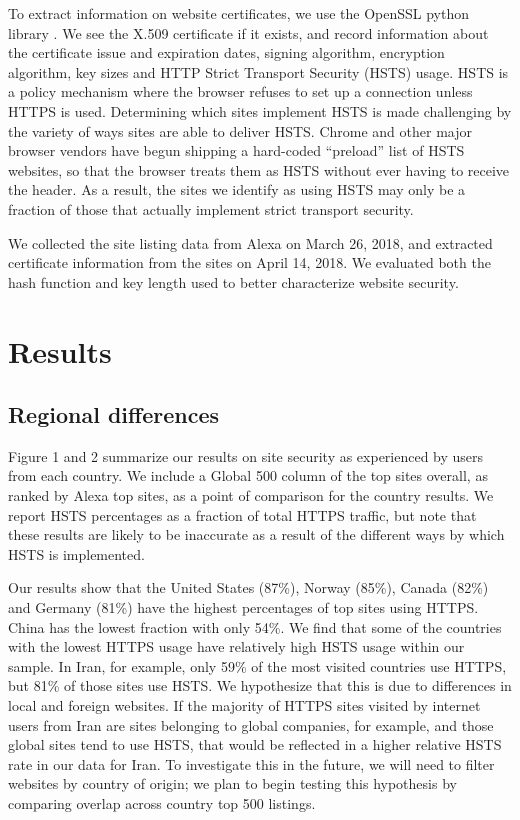 \documentclass{easychair}
\begin{document}
To extract information on website certificates, we use the OpenSSL 
python library \cite{pyopenssl}. We see the X.509 certificate if it
exists, and record information about the certificate issue and 
expiration dates, signing algorithm, encryption algorithm, key sizes and
HTTP Strict Transport Security (HSTS) usage. HSTS is a policy mechanism 
where the browser refuses to set up a connection unless HTTPS is used. 
Determining which sites implement HSTS is made challenging by the 
variety of ways sites are able to deliver HSTS. Chrome and other major 
browser vendors have begun shipping a hard-coded “preload” list of HSTS 
websites, so that the browser treats them as HSTS without ever having to
receive the header. As a result, the sites we identify as using HSTS 
may only be a fraction of those that actually implement strict transport
security.

We collected the site listing data from Alexa on March 26, 2018, 
and extracted certificate information from the sites on April 14, 
2018. We evaluated both the hash function and key length used to better 
characterize website security.


\section{Results}

\subsection{Regional differences}
Figure 1 and 2 summarize our results on site security as experienced by 
users from each country. We include a Global 500 column of the top sites
overall, as ranked by Alexa top sites, as a point of comparison for the 
country results. We report HSTS percentages as a fraction of total HTTPS
traffic, but note that these results are likely to be inaccurate as a 
result of the different ways by which HSTS is implemented.

Our results show that the United States (87\%), Norway (85\%), Canada 
(82\%) and Germany (81\%) have the highest percentages of top 
sites using HTTPS. China has the lowest fraction with only 54\%. We 
find that some of the countries with the lowest HTTPS usage have 
relatively high HSTS usage within our sample. In Iran, for example,
only 59\% of the most visited countries use HTTPS, but 81\% of those 
sites use HSTS. We hypothesize that this is due to differences in local 
and foreign websites. If the majority of HTTPS sites visited by internet
users from Iran are sites belonging to global companies, for example, 
and those global sites tend to use HSTS, that would be reflected in a 
higher relative HSTS rate in our data for Iran. To investigate this in 
the future, we will need to filter websites by country of origin; we 
plan to begin testing this hypothesis by comparing overlap across 
country top 500 listings. 
\end{document}
